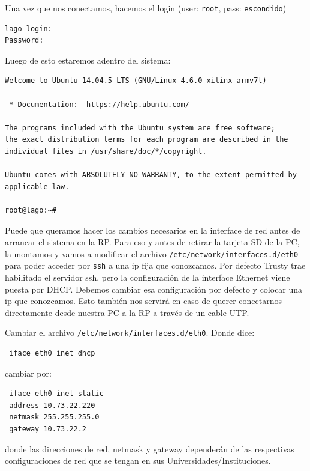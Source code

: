\documentclass[a4paper,11pt]{article}
\begin{document}
\noindent Una vez que nos conectamos, hacemos el login (user: \texttt{root}, pass: \texttt{escondido})
\begin{verbatim}
lago login: 
Password: 
\end{verbatim}

\noindent Luego de esto estaremos adentro del sistema:

\begin{verbatim}
Welcome to Ubuntu 14.04.5 LTS (GNU/Linux 4.6.0-xilinx armv7l)

 * Documentation:  https://help.ubuntu.com/

The programs included with the Ubuntu system are free software;
the exact distribution terms for each program are described in the
individual files in /usr/share/doc/*/copyright.

Ubuntu comes with ABSOLUTELY NO WARRANTY, to the extent permitted by
applicable law.

root@lago:~# 

\end{verbatim}

\noindent Puede que queramos hacer los cambios necesarios en la interface de red antes de
arrancar el sistema en la RP. Para eso y antes de retirar la tarjeta SD de la
PC, la montamos y vamos a modificar el archivo
\texttt{/etc/network/interfaces.d/eth0} para poder acceder por \texttt{ssh} a una ip fija
que conozcamos. Por defecto Trusty trae habilitado el servidor ssh, pero la
configuración de la interface Ethernet viene puesta por DHCP. Debemos cambiar
esa configuración por defecto y colocar una ip que conozcamos. Esto también nos
servirá en caso de querer conectarnos directamente desde nuestra PC a la RP a
través de un cable UTP.

\noindent Cambiar el archivo \texttt{/etc/network/interfaces.d/eth0}. Donde
dice:

\begin{verbatim}
 iface eth0 inet dhcp
\end{verbatim}

\noindent cambiar por:

\begin{verbatim}
 iface eth0 inet static
 address 10.73.22.220 
 netmask 255.255.255.0
 gateway 10.73.22.2
\end{verbatim}

\noindent donde las direcciones de red, netmask y gateway dependerán de las 
respectivas configuraciones de red que se tengan en sus
Universidades/Instituciones.
\end{document}
